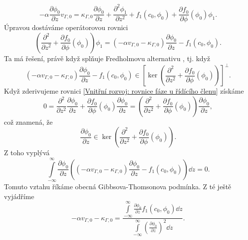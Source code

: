 \begin{itemize}
    \begin{equation}
        -\alpha\frac{\partial \phi_0}{\partial z} v_{\Gamma,0} = \kappa_{\Gamma, 0} \frac{\partial \phi_0}{\partial z} + \frac{\partial^2 \phi_1}{\partial z^2} + f_1(c_0, \phi_0) + \frac{\partial f_0}{\partial \phi}(\phi_0)\phi_1.
    \end{equation}
    Úpravou dostáváme operátorovou rovnici
    \begin{equation}
        \left(\frac{\partial^2 }{\partial z^2} + \frac{\partial f_0}{\partial \phi}(\phi_0)\right)\phi_1 = \left(-\alpha v_{\Gamma,0} - \kappa_{\Gamma, 0}\right) \frac{\partial \phi_0}{\partial z} - f_1(c_0, \phi_0).
    \end{equation}
    Ta má řešení, právě když splňuje Fredholmovu alternativu \cite{Beneš_97}, tj. když
    \begin{equation}
        \left(-\alpha v_{\Gamma,0} - \kappa_{\Gamma, 0}\right) \frac{\partial \phi_0}{\partial z} - f_1(c_0, \phi_0) \in \left[\ker \left( \frac{\partial^2 }{\partial z^2} + \frac{\partial f_0}{\partial \phi}(\phi_0) \right) \right]^{\perp}.
    \end{equation}
    Když zderivujeme rovnici \eqref{Vnitřní rozvoj: rovnice fáze u řídícího členu} získáme
    \begin{equation}
        0 = \frac{\partial^2}{\partial z^2}\frac{\partial \phi_0}{\partial z} + \frac{\partial f_0}{\partial \phi}(\phi_0)\frac{\partial \phi_0}{\partial z} = \left(\frac{\partial^2}{\partial z^2} + \frac{\partial f_0}{\partial \phi}(\phi_0)\right)\frac{\partial \phi_0}{\partial z},
    \end{equation}
    což znamená, že
    \begin{equation}
    \frac{\partial \phi_0}{\partial z} \in \ker \left(\frac{\partial^2}{\partial z^2} + \frac{\partial f_0}{\partial \phi}(\phi_0)\right).  
    \end{equation}
    Z toho vyplývá
    \begin{equation}
        \int\limits_{-\infty}^{\infty} \frac{\partial \phi_0}{\partial z} \left( \left(-\alpha v_{\Gamma,0} - \kappa_{\Gamma, 0}\right) \frac{\partial \phi_0}{\partial z} - f_1(c_0, \phi_0)\right) \dd z = 0.
    \end{equation}
    Tomuto vztahu říkáme obecná Gibbsova-Thomsonova podmínka.
    Z té ještě vyjádříme
    \begin{equation}\label{Vnitřní rozvoj: Podílové vyjádření gibbs thomsona}
        -\alpha v_{\Gamma,0} - \kappa_{\Gamma, 0} = \dfrac{\displaystyle \int\limits_{-\infty}^{\infty}\frac{\partial \phi_0}{\partial z}f_1(c_0, \phi_0) \dd z}{\displaystyle \int\limits_{-\infty}^{\infty} \left(\frac{\partial \phi_0}{\partial z}\right)^2 \dd z}.

\end{equation}
\end{itemize}
